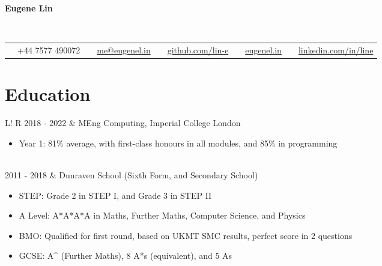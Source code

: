 \documentclass[10pt, a4paper]{article}
\newcommand\vsep{\color{lightgray} \vrule width 0.5pt}
\begin{document}
        \begin{center}
            \bfseries\huge\sc Eugene Lin
        \end{center}
        \
        \begin{tabular*}{0.99\textwidth}{@{\extracolsep{\fill}} ccccc}
            \faPhone \ \ +44 7577 490072 &
            \faEnvelope \ \ \href{mailto:me@eugenel.in}{me@eugenel.in} &
            \faGithub \ \ \href{https://github.com/lin-e/}{github.com/lin-e} &
            \faGlobe \ \ \href{https://eugenel.in/}{eugenel.in} &
            \faLinkedinSquare \ \ \href{https://www.linkedin.com/in/line/}{linkedin.com/in/line}
        \end{tabular*}
        \section*{\large\sc Education}
            \begin{tabular}{L!{\vsep}R}
                2018 - 2022 & MEng Computing, Imperial College London
                \begin{itemize}
                    \item Year 1: 81\% average, with first-class honours in all modules, and 85\% in programming
                    \vspace{-\baselineskip}
                \end{itemize} \\
                2011 - 2018 & Dunraven School (Sixth Form, and Secondary School)
                \begin{itemize}
                    \item STEP: Grade 2 in STEP I, and Grade 3 in STEP II
                    \item A Level: A*A*A*A in Maths, Further Maths, Computer Science, and Physics
                    \item BMO: Qualified for first round, based on UKMT SMC results, perfect score in 2 questions
                    \item GCSE: A\^{} (Further Maths), 8 A*s (equivalent), and 5 As
                    \vspace{-\baselineskip}
                \end{itemize}
            \end{tabular}
\end{document}

